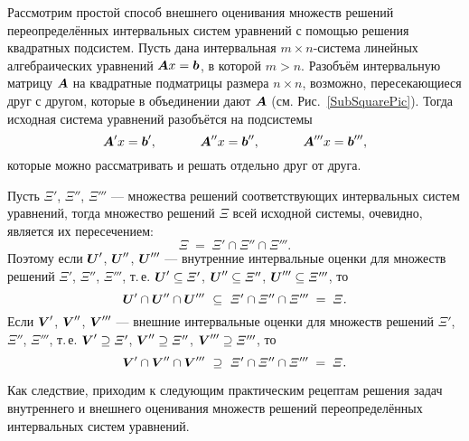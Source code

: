 \documentclass[a5paper,openany]{book}
\newcommand{\mbf}[1]{\protect\text{\boldmath$#1$}}
\begin{document}
  
Рассмотрим простой способ внешнего оценивания множеств решений переопределённых 
интервальных систем уравнений с помощью решения квадратных подсистем. Пусть дана 
интервальная $m\times n$-система линейных алгебраических уравнений $\mbf{A}x = \mbf{b}$, 
в которой $m > n$. Разобъём интервальную матрицу $\mbf{A}$ на квадратные подматрицы 
размера $n\times n$, возможно, пересекающиеся друг с другом, которые в объединении дают 
$\mbf{A}$ (см. Рис.~\ref{SubSquarePic}). Тогда исходная система уравнений разобъётся 
на подсистемы 
\begin{equation*} 
\mbf{A}'x = \mbf{b}', \hspace{12mm} 
   \mbf{A}''x = \mbf{b}'', \hspace{12mm} \mbf{A}'''x = \mbf{b}''', 
\end{equation*} 
которые можно рассматривать и решать отдельно друг от друга. 
  
Пусть $\varXi'$, $\varXi''$, $\varXi'''$ --- множества решений соответствующих интервальных 
систем уравнений, тогда множество решений $\varXi$ всей исходной системы, очевидно, 
является их пересечением:
\begin{equation*} 
\varXi\; = \;\varXi' \cap\varXi'' \cap\varXi'''. 
\end{equation*} 
Поэтому если $\mbf{U}'$, $\mbf{U}''$, $\mbf{U}'''$ --- внутренние интервальные оценки 
для множеств решений $\varXi'$, $\varXi''$, $\varXi'''$, т.\,е. $\mbf{U}'\subseteq\varXi'$, 
$\mbf{U}''\subseteq\varXi''$, $\mbf{U}'''\subseteq\varXi'''$, то 
\begin{equation*} 
\mbf{U}'\cap\mbf{U}''\cap\mbf{U}''' \  \subseteq \  
   \varXi' \cap\varXi'' \cap\varXi''' \; = \;\varXi. 
\end{equation*} 
Если $\mbf{V}'$, $\mbf{V}''$, $\mbf{V}'''$ --- внешние интервальные оценки для множеств 
решений $\varXi'$, $\varXi''$, $\varXi'''$, т.\,е. $\mbf{V}'\supseteq\varXi'$, 
$\mbf{V}''\supseteq\varXi''$, $\mbf{V}'''\supseteq\varXi'''$, то 
\begin{equation*} 
\mbf{V}'\cap\mbf{V}''\cap\mbf{V}''' \  \supseteq \  
   \varXi' \cap\varXi'' \cap\varXi''' \; = \;\varXi. 
\end{equation*} 
  
Как следствие, приходим к следующим практическим рецептам решения задач внутреннего и 
внешнего оценивания множеств решений переопределённых интервальных систем уравнений. 
  
\end{document}
